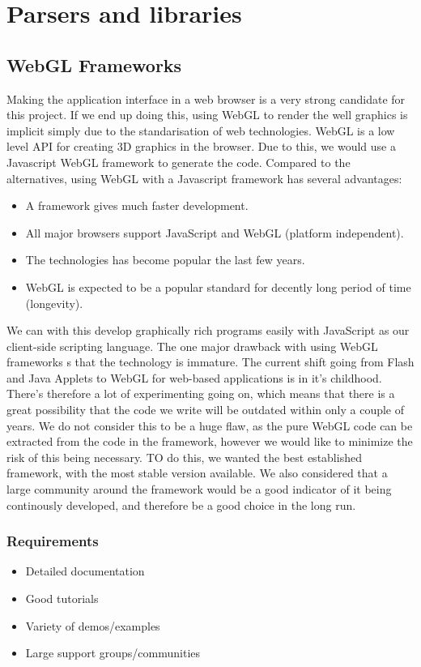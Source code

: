 \documentclass{report}
\begin{document}
\section{Parsers and libraries}

\subsection{WebGL Frameworks}
Making the application interface in a web browser is a very strong candidate for this project. If we end up doing this, using WebGL to render the well graphics is implicit simply due to the standarisation of web technologies. WebGL is a low level API for creating 3D graphics in the browser\cite{website:webgl_opengl}. Due to this, we would use a Javascript WebGL framework to generate the code. Compared to the alternatives, using WebGL with a Javascript framework has several advantages:

\begin{itemize}
\item A framework gives much faster development.
\item All major browsers support JavaScript and WebGL (platform independent). 
\item The technologies has become popular the last few years.
\item WebGL is expected to be a popular standard for decently long period of time (longevity). 
\end{itemize}

We can with this develop graphically rich programs easily with JavaScript as our client-side scripting language. The one major drawback with using WebGL frameworks s that the technology is immature. The current shift going from Flash and Java Applets to WebGL for web-based applications is in it's childhood. There's therefore a lot of experimenting going on, which means that there is a great possibility that the code we write will be outdated within only a couple of years. We do not consider this to be a huge flaw, as the pure WebGL code can be extracted from the code in the framework, however we would like to minimize the risk of this being necessary. TO do this, we wanted the best established framework, with the most stable version available. We also considered that a large community around the framework would be a good indicator of it being continously developed, and therefore be a good choice in the long run. 

\subsubsection{Requirements}
\begin{itemize}
\item Detailed documentation
\item Good tutorials
\item Variety of demos/examples
\item Large support groups/communities
\end{itemize}
\end{document}
